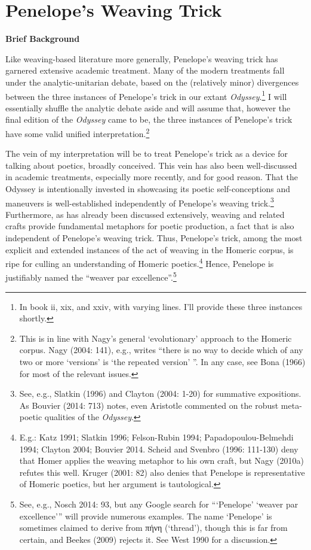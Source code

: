\documentclass[12pt]{article}
\begin{document}
\section{Penelope's Weaving Trick}

\textbf{Brief Background}

Like weaving-based literature more generally, Penelope's weaving trick has garnered extensive academic treatment. Many of the modern treatments fall under the analytic-unitarian debate, based on the (relatively minor) divergences between the three instances of Penelope's trick in our extant \textit{Odyssey}.\footnote{ In book ii, xix, and xxiv, with varying lines. I'll provide these three instances shortly.} I will essentially shuffle the analytic debate aside and will assume that, however the final edition of the \textit{Odyssey} came to be, the three instances of Penelope's trick have some valid unified interpretation.\footnote{ This is in line with Nagy's general `evolutionary' approach to the Homeric corpus. Nagy (2004: 141), e.g., writes ``there is no way to decide which of any two or more `versions' is `the repeated version' ''. In any case, see Bona (1966) for most of the relevant issues.} 

The vein of my interpretation will be to treat Penelope's trick as a device for talking about poetics, broadly conceived. This vein has also been well-discussed in academic treatments, especially more recently, and for good reason. That the Odyssey is intentionally invested in showcasing its poetic self-conceptions and maneuvers is well-established independently of Penelope's weaving trick.\footnote{ See, e.g., Slatkin (1996) and Clayton (2004: 1-20) for summative expositions. As Bouvier (2014: 713) notes, even Aristotle commented on the robust meta-poetic qualities of the \textit{Odyssey}.} Furthermore, as has already been discussed extensively, weaving and related crafts provide fundamental metaphors for poetic production, a fact that is also independent of Penelope's weaving trick. Thus, Penelope's trick, among the most explicit and extended instances of the act of weaving in the Homeric corpus, is ripe for culling an understanding of Homeric poetics.\footnote{ E.g.: Katz 1991; Slatkin 1996; Felson-Rubin 1994; Papadopoulou-Belmehdi 1994; Clayton 2004; Bouvier 2014. Scheid and Svenbro (1996: 111-130) deny that Homer applies the weaving metaphor to his own craft, but Nagy (2010a) refutes this well. Kruger (2001: 82) also denies that Penelope is representative of Homeric poetics, but her argument is tautological.} Hence, Penelope is justifiably named the ``weaver par excellence''.\footnote{ See, e.g., Nosch 2014: 93, but any Google search for ```Penelope' `weaver par excellence'\nospace'' will provide numerous examples. The name `Penelope' is sometimes claimed to derive from πήνη (`thread'), though this is far from certain, and Beekes (2009) rejects it. See West 1990 for a discussion.}
\end{document}
